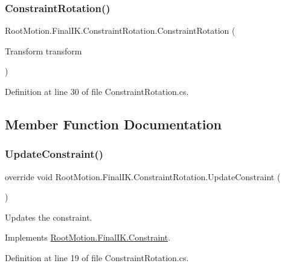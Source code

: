 \subsubsection{\texorpdfstring{Constraint\+Rotation()}{ConstraintRotation()}\hspace{0.1cm}{\footnotesize\ttfamily [2/2]}}
{\footnotesize\ttfamily Root\+Motion.\+Final\+I\+K.\+Constraint\+Rotation.\+Constraint\+Rotation (\begin{DoxyParamCaption}\item[{Transform}]{transform }\end{DoxyParamCaption})}



Definition at line 30 of file Constraint\+Rotation.\+cs.



\subsection{Member Function Documentation}
\mbox{\label{class_root_motion_1_1_final_i_k_1_1_constraint_rotation_a0207bba5082e69f78a72cf7154431159}} 
\subsubsection{\texorpdfstring{Update\+Constraint()}{UpdateConstraint()}}
{\footnotesize\ttfamily override void Root\+Motion.\+Final\+I\+K.\+Constraint\+Rotation.\+Update\+Constraint (\begin{DoxyParamCaption}{ }\end{DoxyParamCaption})\hspace{0.3cm}{\ttfamily [virtual]}}



Updates the constraint. 



Implements \mbox{\hyperlink{class_root_motion_1_1_final_i_k_1_1_constraint_a3abc634189f065586d8d57c653c22fdd}{Root\+Motion.\+Final\+I\+K.\+Constraint}}.



Definition at line 19 of file Constraint\+Rotation.\+cs.



